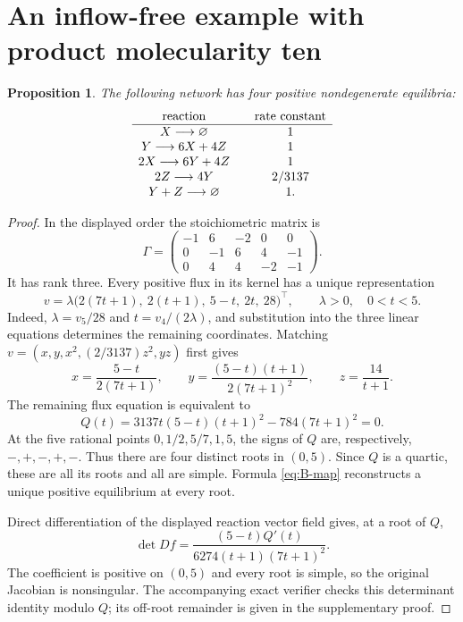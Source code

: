 \documentclass[11pt]{article}
\newtheorem{proposition}{Proposition}
\newcommand{\zero}{\varnothing}
\begin{document}
\section{An inflow-free example with product molecularity ten}
\begin{proposition}\label{prop:B}
The following network has four positive nondegenerate equilibria:
\begin{equation}\label{eq:B-network}
\begin{array}{c@{\qquad}c}
\text{reaction}&\text{rate constant}\\\hline
X\longrightarrow\zero&1\\
Y\longrightarrow6X+4Z&1\\
2X\longrightarrow6Y+4Z&1\\
2Z\longrightarrow4Y&2/3137\\
Y+Z\longrightarrow\zero&1.
\end{array}
\end{equation}
\end{proposition}
\begin{proof}
In the displayed order the stoichiometric matrix is
\[
\Gamma=\begin{pmatrix}-1&6&-2&0&0\\0&-1&6&4&-1\\0&4&4&-2&-1\end{pmatrix}.
\]
It has rank three. Every positive flux in its kernel has a unique representation
\[
v=\lambda\bigl(2(7t+1),\ 2(t+1),\ 5-t,\ 2t,\ 28\bigr)^\top,
\qquad \lambda>0,\quad 0<t<5.
\]
Indeed, $\lambda=v_5/28$ and $t=v_4/(2\lambda)$, and substitution into the three linear equations determines the remaining coordinates. Matching $v=(x,y,x^2,(2/3137)z^2,yz)$ first gives
\begin{equation}\label{eq:B-map}
x=\frac{5-t}{2(7t+1)},\qquad
y=\frac{(5-t)(t+1)}{2(7t+1)^2},\qquad
z=\frac{14}{t+1}.
\end{equation}
The remaining flux equation is equivalent to
\begin{equation}\label{eq:B-poly}
Q(t)=3137t(5-t)(t+1)^2-784(7t+1)^2=0.
\end{equation}
At the five rational points $0,1/2,5/7,1,5$, the signs of $Q$ are, respectively, $-,+,-,+,-$. Thus there are four distinct roots in $(0,5)$. Since $Q$ is a quartic, these are all its roots and all are simple. Formula \eqref{eq:B-map} reconstructs a unique positive equilibrium at every root.

Direct differentiation of the displayed reaction vector field gives, at a root of $Q$,
\[
\det Df=\frac{(5-t)Q'(t)}{6274(t+1)(7t+1)^2}.
\]
The coefficient is positive on $(0,5)$ and every root is simple, so the original Jacobian is nonsingular. The accompanying exact verifier checks this determinant identity modulo $Q$; its off-root remainder is given in the supplementary proof.
\end{proof}
\end{document}
